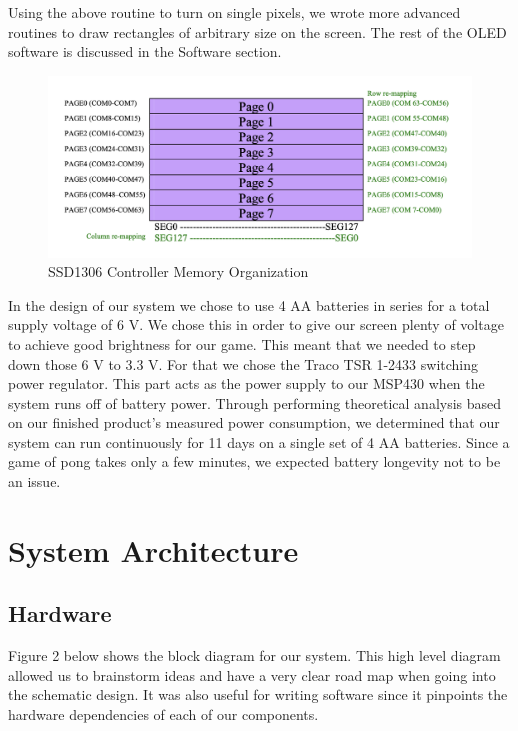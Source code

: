 \documentclass{article}
\begin{document}
Using the above routine to turn on single pixels, we wrote more advanced routines to draw rectangles of arbitrary size on the screen. The rest of the OLED software is discussed in the Software section.

\begin{figure}[h!]
    \centering
    \includegraphics[width=\textwidth]{buffre.png}
    \caption{SSD1306 Controller Memory Organization}
    \label{fig:my_label}
\end{figure}

 In the design of our system we chose to use 4 AA batteries in series for a total supply voltage of 6 V. We chose this in order to give our screen plenty of voltage to achieve good brightness for our game. This meant that we needed to step down those 6 V to 3.3 V. For that we chose the Traco TSR 1-2433 switching power regulator. This part acts as the power supply to our MSP430 when the system runs off of battery power. Through performing theoretical analysis based on our finished product's measured power consumption, we determined that our system can run continuously for 11 days on a single set of 4 AA batteries. Since a game of pong takes only a few minutes, we expected battery longevity not to be an issue.


\section{System Architecture}
\subsection{Hardware}

Figure 2 below shows the block diagram for our system. This high level diagram allowed us to brainstorm ideas and have a very clear road map when going into the schematic design. It was also useful for writing software since it pinpoints the hardware dependencies of each of our components.
\end{document}

